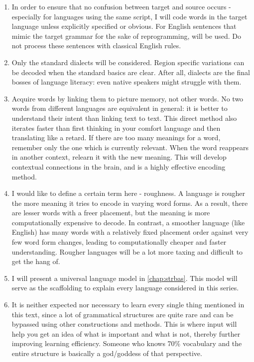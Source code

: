 \begin{enumerate}
    \item In order to ensure that no confusion between target and source occurs - especially for languages using the same script, I will code words in the target language  unless explicitly specified or obvious. For English sentences that mimic the target grammar for the sake of reprogramming,  will be used. Do not process these sentences with classical English rules.
    \item Only the standard dialects will be considered. Region specific variations can be decoded when the standard basics are clear. After all, dialects are the final bosses of language literacy: even native speakers might struggle with them.
    \item Acquire words by linking them to picture memory, not other words. No two words from different languages are equivalent in general: it is better to understand their intent than linking text to text. This direct method also iterates faster than first thinking in your comfort language and then translating like a retard. If there are too many meanings for a word, remember only the one which is currently relevant. When the word reappears in another context, relearn it with the new meaning. This will  develop contextual connections in the brain, and is a highly effective encoding method.
    \item I would like to define a certain term here - roughness. A language is rougher the more meaning it tries to encode in varying word forms. As a result, there are lesser words  with a freer placement, but the meaning is more computationally expensive to decode. In contrast, a smoother language (like English) has many words with a relatively fixed placement order against very few word form changes, leading to  computationally cheaper and faster understanding.  Rougher languages will be a lot more taxing and difficult to get the hang of.
    \item I will present a universal language model in \autoref{chap:strbas}. This model will serve as the scaffolding to explain every language considered in this series.
    \item It is neither expected nor necessary to learn every single thing mentioned in this text, since a lot of grammatical structures are quite rare and can be bypassed using other constructions and methods. This is where input will help you get an idea of what is important and what is not, thereby further improving  learning efficiency. Someone who knows 70\% vocabulary and the entire structure is basically a  god/goddess of that perspective.

\end{enumerate}
